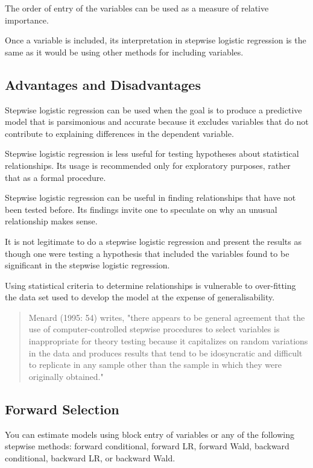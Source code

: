 \documentclass[a4paper,12pt]{article}
\begin{document}
The order of entry of the variables can be used as a measure of relative importance.

Once a variable is included, its interpretation in stepwise logistic regression is the same as it would be using other methods for including variables.
\subsection{Advantages and Disadvantages}
Stepwise logistic regression can be used when the goal is to produce a predictive model that is parsimonious and accurate because it excludes variables that do not contribute to explaining differences in the dependent variable.

Stepwise logistic regression is less useful for testing hypotheses about statistical relationships. Its usage is recommended only for exploratory purposes, rather that as a formal procedure.

Stepwise logistic regression can be useful in finding relationships that have not been tested before. Its findings invite one to speculate on why an unusual relationship makes sense.

It is not legitimate to do a stepwise logistic regression and present the results as though one were testing a hypothesis that included the variables found to be significant in the stepwise logistic regression.

Using statistical criteria to determine relationships is vulnerable to over-fitting the data set used to develop the model at the expense of generalisability.

\begin{quote}
	Menard (1995: 54) writes, "there appears to be general agreement that the use of computer-controlled stepwise procedures to select variables is inappropriate for theory testing because it capitalizes on random variations in the data and produces results that tend to be idosyncratic and difficult to replicate in any sample other than the sample in which they were originally obtained."
\end{quote}
\subsection{Forward Selection}
You can estimate models using block entry of variables or any of the following stepwise
methods: forward conditional, forward LR, forward Wald, backward conditional, backward
LR, or backward Wald.
\end{document}
